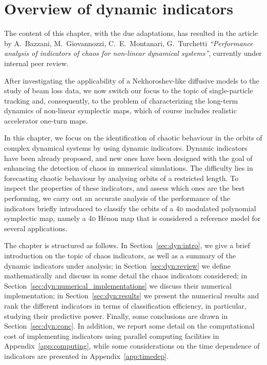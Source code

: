 \chapter{Overview of dynamic indicators}\label{ch:overview_of_dynamic_indicators}
\noindent\textsf{The content of this chapter, with the due adaptations, has resulted in the article by A.\ Bazzani, M.\ Giovannozzi, C.\ E.\ Montanari, G.\ Turchetti \textit{``Performance analysis of indicators of chaos for non-linear dynamical systems''}, currently under internal peer review.}

\vspace{3em}

After investigating the applicability of a Nekhoroshev-like diffusive models to the study of beam loss data, we now switch our focus to the topic of single-particle tracking and, consequently, to the problem of characterizing the long-term dynamics of non-linear symplectic maps, which of course includes realistic accelerator one-turn maps.

In this chapter, we focus on the identification of chaotic behaviour in the orbits of complex dynamical systems by using dynamic indicators. Dynamic indicators have been already proposed, and new ones have been designed with the goal of enhancing the detection of chaos in numerical simulations. The difficulty lies in forecasting chaotic behaviour by analysing orbits of a restricted length. To inspect the properties of these indicators, and assess which ones are the best performing, we carry out an accurate analysis of the performance of the indicators briefly introduced to classify the orbits of a 4\textsc{d} modulated polynomial symplectic map, namely a 4\textsc{d} H\'enon map that is considered a reference model for several applications. 

The chapter is structured as follows. In Section~\ref{sec:dyn:intro}, we give a brief introduction on the topic of chaos indicators, as well as a summary of the dynamic indicators under analysis; in Section~\ref{sec:dyn:review} we define mathematically and discuss in some detail the chaos indicators considered; in Section~\ref{sec:dyn:numerical_implementations} we discuss their numerical implementation; in Section~\ref{sec:dyn:results} we present the numerical results and rank the different indicators in terms of classification efficiency, in particular, studying their predictive power. Finally, some conclusions are drawn in Section~\ref{sec:dyn:conc}. In addition, we report some detail on the computational cost of implementing indicators using parallel computing facilities in Appendix~\ref{app:computing}, while some considerations on the time dependence of indicators are presented in Appendix~\ref{app:timedep}. 

